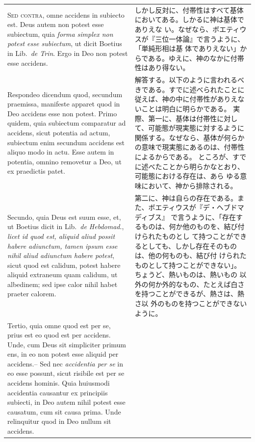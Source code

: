 \documentclass[paper=a4paper,fontsize=10pt,jafontsize=9pt,titlepage]{jlreq}
\begin{document}
\begin{longtable}{p{21em}p{21em}}
{\scshape Sed contra}, omne accidens in subiecto est. Deus autem non
 potest esse subiectum, quia {\itshape forma simplex non potest esse
 subiectum}, ut dicit Boetius in Lib.~{\itshape de Trin}. Ergo in Deo
 non potest esse accidens.

&

しかし反対に、付帯性はすべて基体においてある。しかるに神は基体でありえな
 い。なぜなら、ボエティウスが『三位一体論』で言うように、「単純形相は基
 体でありえない」からである。ゆえに、神のなかに付帯性はあり得ない。

\\

Respondeo dicendum quod, secundum praemissa, manifeste apparet quod in
 Deo accidens esse non potest. 
Primo quidem, quia subiectum comparatur ad accidens, sicut potentia ad actum, subiectum enim secundum accidens est aliquo modo in actu.
Esse autem in potentia, omnino removetur a Deo, ut ex praedictis patet.

&

解答する。以下のように言われるべきである。すでに述べられたことに従えば、神の中に付帯性がありえないことは明白に明らかである。
実際、第一に、基体は付帯性に対して、可能態が現実態に対するように関係する。なぜなら、基体が何らかの意味で現実態にあるのは、付帯性によるからである。
ところが、すでに述べたことから明らかなとおり、可能態における存在は、あら
 ゆる意味において、神から排除される。


\\

Secundo, quia Deus est suum esse, et, ut Boetius dicit in Lib.~{\itshape de
 Hebdomad}., {\itshape licet id quod est, aliquid aliud possit habere adiunctum,
 tamen ipsum esse nihil aliud adiunctum habere potest}, sicut quod est
 calidum, potest habere aliquid extraneum quam calidum, ut albedinem;
 sed ipse calor nihil habet praeter calorem.

&

第二に、神は自らの存在である。また、ボエティウスが『デ・ヘブドマディブス』
 で言うように、「存在するものは、何か他のものを、結び付けられたものとし
 て持つことができるとしても、しかし存在そのものは、他の何ものも、結び付
 けられたものとして持つことができない」。ちょうど、熱いものは、熱いもの
 以外の何か外的なもの、たとえば白さを持つことができるが、熱さは、熱さ以
 外のものを持つことができないように。

\\

Tertio, quia omne quod est per se, prius est eo quod est per accidens.
Unde, cum Deus sit simpliciter primum ens, in eo non potest esse aliquid
per accidens.-- Sed nec {\itshape accidentia per se} in eo esse possunt,
sicut risibile est per se accidens hominis.  Quia huiusmodi accidentia
causantur ex principiis subiecti, in Deo autem nihil potest esse
causatum, cum sit causa prima. Unde relinquitur quod in Deo nullum sit
accidens.  


\end{longtable}
\end{document}

